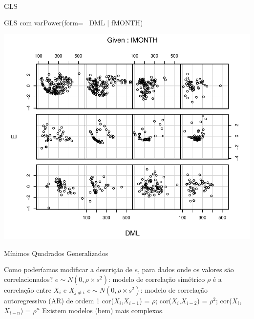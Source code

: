 \documentclass{beamer}\usepackage[]{graphicx}\usepackage[]{color}
\newenvironment{knitrout}{}{} %
\renewenvironment{knitrout}{\setlength{\topsep}{0mm}}{}
\begin{document}
\begin{frame}[fragile]{GLS}

 GLS com varPower(form=~ DML | fMONTH)

\begin{knitrout}
\color{fgcolor}
\includegraphics[width=0.7\linewidth]{figure/glsp6-1} 

\end{knitrout}


\end{frame}


\begin{frame}{Mínimos Quadrados Generalizados}

Como poderíamos modificar a descrição de $e$, para dados onde os valores são correlacionados? \pause
\vfill
$e \sim N(0,\rho \times s^2 )$: modelo de correlação simétrico 
\vfill 
$\rho$ é a correlação entre $X_i$ e $X_{j\ne i}$ \pause
\vfill
$e \sim N(0,\rho \times s^2 )$: modelo de correlação autoregressivo (AR) de ordem 1
\vfill 
cor($X_i$,$X_{i-1}$) = $\rho$;  cor($X_i$,$X_{i-2}$) = $\rho ^2$; cor($X_i$,$X_{i-n}$) = $\rho ^n$ \pause
\vfill
Existem modelos (bem) mais complexos.

\end{frame}
\end{document}
